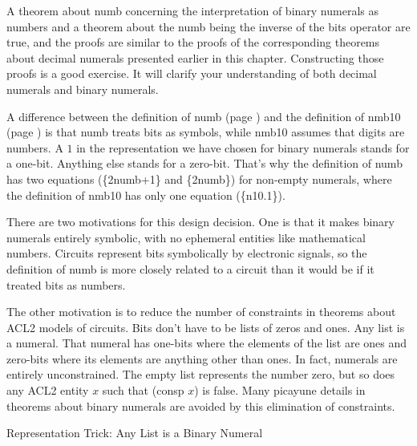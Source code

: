A theorem about \textsf{numb} concerning the interpretation of
binary numerals as numbers and a theorem about the \textsf{numb}
being the inverse of the \textsf{bits} operator are true,
and the proofs are similar to the proofs of the corresponding
theorems about decimal numerals presented earlier in this chapter.
Constructing those proofs is a good exercise.
It will clarify your understanding of both decimal numerals
and binary numerals.

\begin{aside}
A difference between the definition of \textsf{numb} (page \pageref{nmb-defun})
and the definition of \textsf{nmb10} (page \pageref{nmb10-defun})
is that \textsf{numb} treats bits as symbols,
while \textsf{nmb10} assumes that digits are numbers.
A $1$ in the representation we have chosen for binary numerals
stands for a one-bit. Anything else stands for a zero-bit.
That's why the definition of \textsf{numb} has two equations (\{2numb+1\} and \{2numb\})
for non-empty numerals,
where the definition of \textsf{nmb10} has only one equation (\{n10.1\}).

There are two motivations for this design decision.
One is that it makes binary numerals entirely symbolic,
with no ephemeral entities like mathematical numbers.
Circuits represent bits symbolically by electronic signals,
so the definition of \textsf{numb} is more closely
related to a circuit than it would be if it treated
bits as numbers.

The other motivation is to reduce the number of constraints
in theorems about ACL2 models of circuits.
Bits don't have to be lists of zeros and ones.
Any list is a numeral.
That numeral has one-bits where the elements of the list are ones
and zero-bits where its elements are anything other than ones.
In fact, numerals are entirely unconstrained.
The empty list represents the number zero,
but so does any ACL2 entity $x$ such that \textsf{(consp $x$)} is false.
Many picayune details in theorems about binary numerals
are avoided by this elimination of constraints.
\caption{Representation Trick: Any List is a Binary Numeral}
\label{aside:numeral-representation-trick}
\end{aside}

